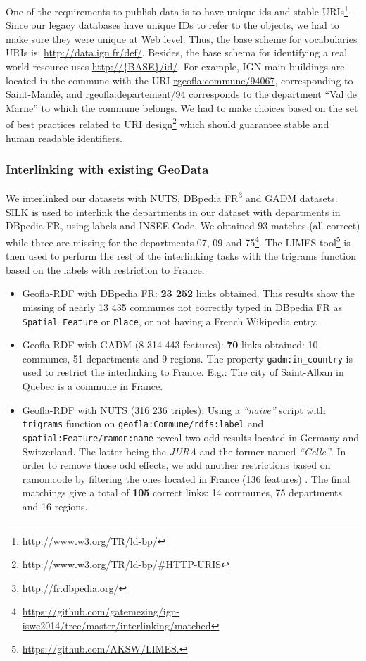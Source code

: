 One of the requirements to publish data is to have unique ids and stable URIs\footnote{\url{http://www.w3.org/TR/ld-bp/}} . Since our legacy databases have unique IDs to refer to the objects, we had to make sure they were unique at Web level. Thus, the base scheme for vocabularies URIs is: \url{http://data.ign.fr/def/}. Besides, the base schema for identifying a real world resource uses \url{http://{BASE}/id/}. For example, IGN main buildings  are located in the commune with the URI \url{rgeofla:commune/94067}, corresponding to Saint-Mand\'{e}, and \url{rgeofla:departement/94} corresponds to the department ``Val de Marne'' to which the commune belongs.
We had to make choices based on the set of best practices related to URI design\footnote{\url{http://www.w3.org/TR/ld-bp/\#HTTP-URIS}} which should guarantee stable and human readable identifiers.


\subsubsection{Interlinking with existing GeoData} \label{sec:mapping}
We interlinked our datasets with NUTS, DBpedia FR\footnote{\url{http://fr.dbpedia.org/}} and GADM datasets. SILK \cite{jentzsch2010silk} is used to interlink the departments in our dataset with departments in DBpedia FR, using labels and INSEE Code. We obtained $93$ matches (all correct) while three are missing for the departments 07, 09 and 75\footnote{\url{https://github.com/gatemezing/ign-iswc2014/tree/master/interlinking/matched}}. The 
LIMES tool\footnote{\url{https://github.com/AKSW/LIMES.}} is then used to perform the rest of the interlinking tasks \cite{ngon13} with the trigrams function based on the labels with restriction to France.

\begin{itemize}
 \item Geofla-RDF with DBpedia FR: \textbf{23 252} links obtained. This results show the missing of nearly 13 435 communes not correctly typed in DBpedia FR as \texttt{Spatial Feature} or \texttt{Place}, or not having a French Wikipedia entry.
 \item Geofla-RDF with GADM (8 314 443 features): \textbf{70} links obtained: 10 communes, 51 departments and 9 regions. The property \texttt{gadm:in\_country} is used to restrict the interlinking to France. E.g.: The city of Saint-Alban in Quebec is a commune in France.
 \item Geofla-RDF with NUTS (316 236 triples): Using a \textit{``naive''} script with \texttt{trigrams} function on \texttt{geofla:Commune/rdfs:label} and \texttt{spatial:Feature/ramon:name} reveal two odd results located in Germany and Switzerland. The latter being the \textit{JURA } and the former named \textit{``Celle''}.  In order to remove those odd effects, we add another restrictions based on \textsf{ramon:code} by filtering the ones located in France (136 features) . The final matchings give a total of \textbf{105} correct links: 14 communes, 75 departments and 16 regions.
\end{itemize}

